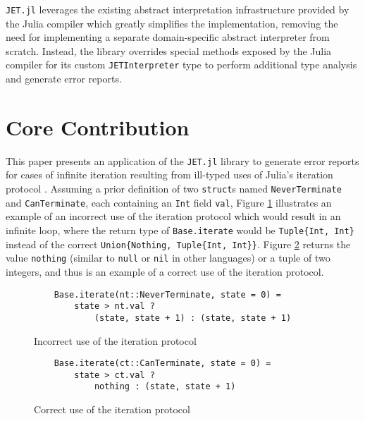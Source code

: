 \documentclass[manuscript, nonacm]{acmart}
\begin{document}
\texttt{JET.jl} leverages the existing abstract interpretation infrastructure provided by the Julia compiler which greatly simplifies the implementation, removing the need for implementing a separate domain-specific abstract interpreter from scratch. Instead, the library overrides special methods exposed by the Julia compiler for its custom \texttt{JETInterpreter} type to perform additional type analysis and generate error reports.

\section{Core Contribution}
This paper presents an application of the \texttt{JET.jl} library to generate error reports for cases of infinite iteration resulting from ill-typed uses of Julia's iteration protocol \cite{julia-iteration}. Assuming a prior definition of two \texttt{struct}s named \texttt{NeverTerminate} and \texttt{CanTerminate}, each containing an \texttt{Int} field \texttt{val}, Figure \ref{fig:bad-iteration} illustrates an example of an incorrect use of the iteration protocol which would result in an infinite loop, where the return type of \texttt{Base.iterate} would be \verb|Tuple{Int, Int}| instead of the correct \verb|Union{Nothing, Tuple{Int, Int}}|. Figure \ref{fig:good-iteration} returns the value \texttt{nothing} (similar to \texttt{null} or \texttt{nil} in other languages) or a tuple of two integers, and thus is an example of a correct use of the iteration protocol.

\begin{figure}
    \begin{verbatim}
    Base.iterate(nt::NeverTerminate, state = 0) =
        state > nt.val ?
            (state, state + 1) : (state, state + 1)
    \end{verbatim}
    \caption{Incorrect use of the iteration protocol}
    \label{fig:bad-iteration}
\end{figure}

\begin{figure}
    \begin{verbatim}
    Base.iterate(ct::CanTerminate, state = 0) =
        state > ct.val ?
            nothing : (state, state + 1)
    \end{verbatim}
    \caption{Correct use of the iteration protocol}
    \label{fig:good-iteration}
\end{figure}
\end{document}
